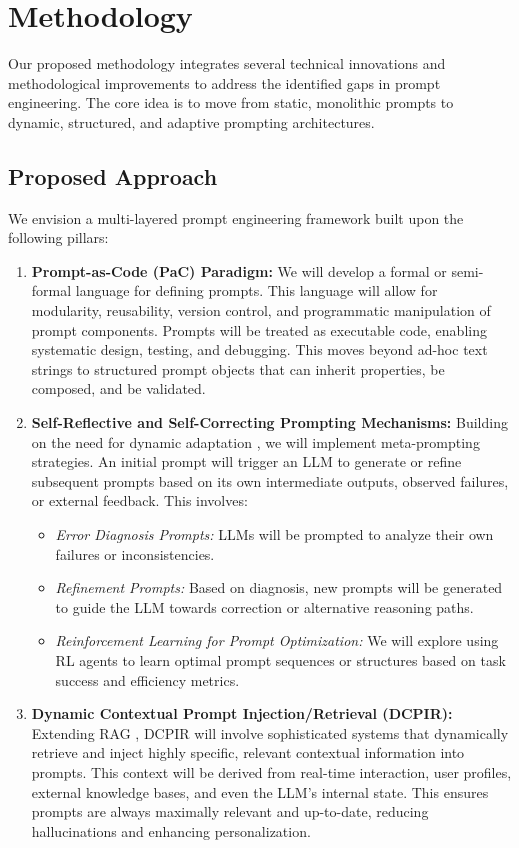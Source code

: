 \documentclass{article}
\begin{document}
\section{Methodology}

Our proposed methodology integrates several technical innovations and methodological improvements to address the identified gaps in prompt engineering. The core idea is to move from static, monolithic prompts to dynamic, structured, and adaptive prompting architectures.

\subsection{Proposed Approach}
We envision a multi-layered prompt engineering framework built upon the following pillars:

\begin{enumerate}
    \item \textbf{Prompt-as-Code (PaC) Paradigm:} We will develop a formal or semi-formal language for defining prompts. This language will allow for modularity, reusability, version control, and programmatic manipulation of prompt components. Prompts will be treated as executable code, enabling systematic design, testing, and debugging. This moves beyond ad-hoc text strings to structured prompt objects that can inherit properties, be composed, and be validated.
    \item \textbf{Self-Reflective and Self-Correcting Prompting Mechanisms:} Building on the need for dynamic adaptation \citep{paper1}, we will implement meta-prompting strategies. An initial prompt will trigger an LLM to generate or refine subsequent prompts based on its own intermediate outputs, observed failures, or external feedback. This involves:
    \begin{itemize}
        \item \textit{Error Diagnosis Prompts:} LLMs will be prompted to analyze their own failures or inconsistencies.
        \item \textit{Refinement Prompts:} Based on diagnosis, new prompts will be generated to guide the LLM towards correction or alternative reasoning paths.
        \item \textit{Reinforcement Learning for Prompt Optimization:} We will explore using RL agents to learn optimal prompt sequences or structures based on task success and efficiency metrics.
    \end{itemize}
    \item \textbf{Dynamic Contextual Prompt Injection/Retrieval (DCPIR):} Extending RAG \citep{paper5}, DCPIR will involve sophisticated systems that dynamically retrieve and inject highly specific, relevant contextual information into prompts. This context will be derived from real-time interaction, user profiles, external knowledge bases, and even the LLM's internal state. This ensures prompts are always maximally relevant and up-to-date, reducing hallucinations and enhancing personalization.

\end{enumerate}
\end{document}
